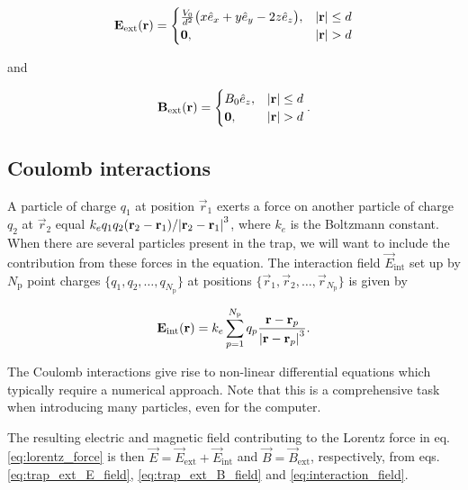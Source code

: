 \begin{equation}\label{eq:trap_ext_E_field}
    \mathbf{E}_\mathrm{ext} (\mathbf{r}) = 
    \begin{cases}
        \frac{V_0}{d^2} \big( x\hat{e}_x + y\hat{e}_y -2z\hat{e}_z \big), & \abs{\mathbf{r}} \leq d \\
        \mathbf{0},  & \abs{\mathbf{r}} > d
    \end{cases}
\end{equation}

and

\begin{equation}\label{eq:trap_ext_B_field}
    \mathbf{B}_\mathrm{ext} (\mathbf{r}) = 
    \begin{cases}
        B_0\hat{e}_z, & \abs{\mathbf{r}} \leq d \\
        \mathbf{0}, & \abs{\mathbf{r}} > d
    \end{cases}.
\end{equation}



\subsection{Coulomb interactions}

A particle of charge $q_1$ at position $\vec{r}_1$ exerts a force on another particle of charge $q_2$ at $\vec{r}_2$ equal $k_e q_1q_2 (\mathbf{r}_2-\mathbf{r}_1) / \abs{\mathbf{r}_2-\mathbf{r}_1}^3$, where $k_e$ is the Boltzmann constant. When there are several particles present in the trap, we will want to include the contribution from these forces in the equation. The interaction field $\vec{E}_\mathrm{int}$ set up by $N_\mathrm{p}$ point charges $\{q_1, q_2, \dots, q_{N_\mathrm{p}}\}$ at positions $\{\vec{r}_1, \vec{r}_2, \dots, \vec{r}_{N_\mathrm{p}}\}$ is given by

\begin{equation}\label{eq:interaction_field}
    \mathbf{E}_\mathrm{int} (\mathbf{r}) = k_e \sum_{p=1}^{N_\mathrm{p}} q_p \frac{\mathbf{r}-\mathbf{r}_p}{\abs{\mathbf{r}-\mathbf{r}_p}^3}.
\end{equation}

The Coulomb interactions give rise to non-linear differential equations which typically require a numerical approach. Note that this is a comprehensive task when introducing many particles, even for the computer. 

The resulting electric and magnetic field contributing to the Lorentz force in eq. \eqref{eq:lorentz_force} is then $\vec{E} = \vec{E}_\mathrm{ext} + \vec{E}_\mathrm{int}$ and $\vec{B} = \vec{B}_\mathrm{ext}$, respectively, from eqs. \eqref{eq:trap_ext_E_field}, \eqref{eq:trap_ext_B_field} and \eqref{eq:interaction_field}.




